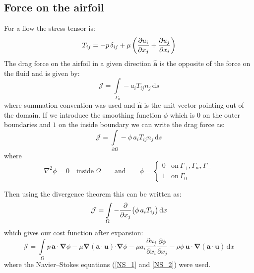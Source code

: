 \documentclass[12pt, a4paper]{article}
\begin{document}
    \subsection{Force on the airfoil}
    For a flow the stress tensor is:
    \begin{equation} \label{stress_tensor}
    T_{ij} = -p \, \delta_{ij} +
    \mu \, \bigg{(}\frac{\partial u_i}{\partial x_j} + \frac{\partial u_j}{\partial x_i} \bigg{)}
    \end{equation}
    The drag force on the airfoil in a given direction $\mathbf{\hat{a}}$ is the opposite of the force on the fluid and is given by:
    \begin{equation} \label{direct_force}
    \mathcal{J} = \int\limits_{\Gamma_0} -a_i T_{ij} n_j \, \mathrm{d}s
    \end{equation}
    where summation convention was used and $\mathbf{\hat{n}}$ is the unit vector pointing out of the domain. If we introduce the smoothing function $\phi$ which is $0$ on the outer boundaries and $1$ on the inside boundary we can write the drag force as:
    \begin{equation} \label{direct_force_phi}
    \mathcal{J} = \int\limits_{\partial \Omega} - \phi \, a_i T_{ij} n_j \, \mathrm{d}s
    \end{equation}
    where
    \begin{equation} \label{phi_definition}
    \nabla^2 \phi = 0 \quad \text{inside}\ \Omega
    \qquad \text{and} \qquad
    \phi = \begin{cases}
    0	 &	\text{on}\ \Gamma_+, \Gamma_w, \Gamma_- \\
    1	 &	\text{on}\ \Gamma_0
    \end{cases}
    \end{equation}
    
    Then using the divergence theorem this can be written as:
    \begin{equation} \label{force_divergence}
    \mathcal{J} = \int\limits_{\Omega} - \frac{\partial}{\partial x_j}\big{(}\phi \, a_i T_{ij} \big{)} \, \mathrm{d}x
    \end{equation}
    which gives our cost function after expansion:
    \begin{equation} \label{cost_function}
    \mathcal{J} = \int\limits_{\Omega}{{p\, \mathbf{a \cdot} \boldsymbol{\nabla} \phi} -
        {\mu \boldsymbol{\nabla}(\mathbf{a \cdot u}) \mathbf{\cdot} \boldsymbol{\nabla} \phi} - 
        {\mu a_i \frac{\partial u_j}{\partial x_i} \frac{\partial \phi}{\partial x_j}} - 
        {\rho \phi \, \mathbf{u \cdot} \boldsymbol{\nabla}(\mathbf{a \cdot u})}
        \,  \mathrm{d}x}
    \end{equation}
    where the Navier--Stokes equations (\ref{NS_1} and \ref{NS_2}) were used.
    
\end{document}
